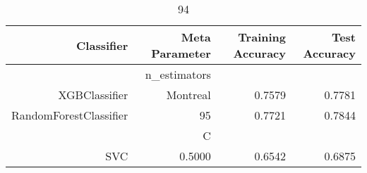 
\begin{table}[H]
    \caption{94}
    \centering
    \begin{tabular}{|r|r|r|r|}
        \hline
        Classifier &Meta Parameter &Training Accuracy
        &Test Accuracy\\
        \hline
        &n\_estimators &\multicolumn{2}{|r|}{}\\
        \hline
        XGBClassifier &Montreal &0.7579 &0.7781\\
        \hline
        RandomForestClassifier &95 &0.7721 &0.7844\\
        \hline
        &C &\multicolumn{2}{|r|}{}\\
        \hline
        SVC &0.5000 &0.6542 &0.6875\\
        \hline
    \end{tabular}
\end{table}
